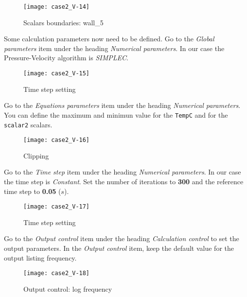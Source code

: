 \begin{figure}[h!]
\begin{center}
\texttt{[image: case2\_V-14]}
\caption{Scalars boundaries: wall\_5}
\label{fig21_e2}
\end{center}
\end{figure}

\newpage
Some calculation parameters now need to be defined.
Go to the {\itshape Global parameters} item under the heading
{\itshape Numerical parameters}.
In our case the Pressure-Velocity algorithm is  {\itshape SIMPLEC}.
\begin{figure}[h!]
\begin{center}
\texttt{[image: case2\_V-15]}
\caption{Time step setting}
\label{fig23_e2}
\end{center}
\end{figure}

\newpage
Go to the {\itshape Equations parameters} item under the heading
{\itshape Numerical parameters}. You can define the maximum and
minimun value for the \texttt{TempC} and for the \texttt{scalar2} scalars.
\begin{figure}[h!]
\begin{center}
\texttt{[image: case2\_V-16]}
\caption{Clipping}
\label{fig24_e2}
\end{center}
\end{figure}

\newpage
Go to the {\itshape Time step} item under the heading
{\itshape Numerical parameters}. In our case the time step is
{\itshape Constant}. Set the number of iterations to {\bf 300} and the
reference time step to {\bf 0.05} ($s$).
\begin{figure}[h!]
\begin{center}
\texttt{[image: case2\_V-17]}
\caption{Time step setting}
\label{fig24_e2}
\end{center}
\end{figure}


\newpage
Go to the {\itshape Output control} item under the heading {\itshape Calculation control} to set the output parameters.
In the {\itshape Output control} item, keep the default value for the output listing frequency.
\begin{figure}[h!]
\begin{center}
\texttt{[image: case2\_V-18]}
\caption{Output control: log frequency}
\label{fig23a_e2}
\end{center}
\end{figure}


